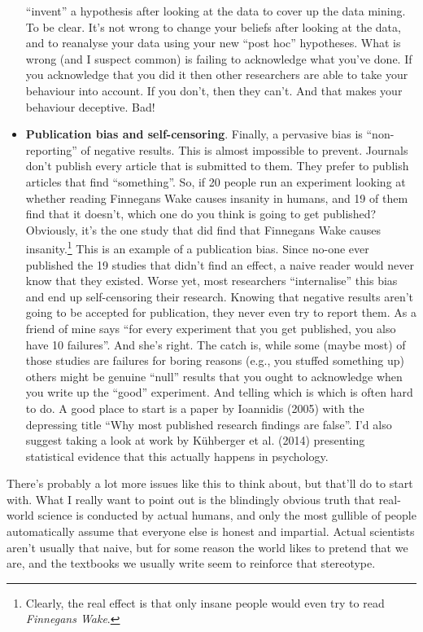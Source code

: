 \documentclass[
  a4paper,
]{book}
\begin{document}
\begin{itemize}
  ``invent'' a hypothesis after looking at the data to cover up the data
  mining. To be clear. It's not wrong to change your beliefs after
  looking at the data, and to reanalyse your data using your new ``post
  hoc'' hypotheses. What is wrong (and I suspect common) is failing to
  acknowledge what you've done. If you acknowledge that you did it then
  other researchers are able to take your behaviour into account. If you
  don't, then they can't. And that makes your behaviour deceptive. Bad!
\item
  \textbf{Publication bias and self-censoring}. Finally, a pervasive
  bias is ``non-reporting'' of negative results. This is almost
  impossible to prevent. Journals don't publish every article that is
  submitted to them. They prefer to publish articles that find
  ``something''. So, if 20 people run an experiment looking at whether
  reading Finnegans Wake causes insanity in humans, and 19 of them find
  that it doesn't, which one do you think is going to get published?
  Obviously, it's the one study that did find that Finnegans Wake causes
  insanity.\footnote{Clearly, the real effect is that only insane people
    would even try to read \emph{Finnegans Wake}.} This is an example of
  a publication bias. Since no-one ever published the 19 studies that
  didn't find an effect, a naive reader would never know that they
  existed. Worse yet, most researchers ``internalise'' this bias and end
  up self-censoring their research. Knowing that negative results aren't
  going to be accepted for publication, they never even try to report
  them. As a friend of mine says ``for every experiment that you get
  published, you also have 10 failures''. And she's right. The catch is,
  while some (maybe most) of those studies are failures for boring
  reasons (e.g., you stuffed something up) others might be genuine
  ``null'' results that you ought to acknowledge when you write up the
  ``good'' experiment. And telling which is which is often hard to do. A
  good place to start is a paper by Ioannidis (2005) with the depressing
  title ``Why most published research findings are false''. I'd also
  suggest taking a look at work by Kühberger et al. (2014) presenting
  statistical evidence that this actually happens in psychology.
\end{itemize}

There's probably a lot more issues like this to think about, but that'll
do to start with. What I really want to point out is the blindingly
obvious truth that real-world science is conducted by actual humans, and
only the most gullible of people automatically assume that everyone else
is honest and impartial. Actual scientists aren't usually that naive,
but for some reason the world likes to pretend that we are, and the
textbooks we usually write seem to reinforce that stereotype.
\end{document}

